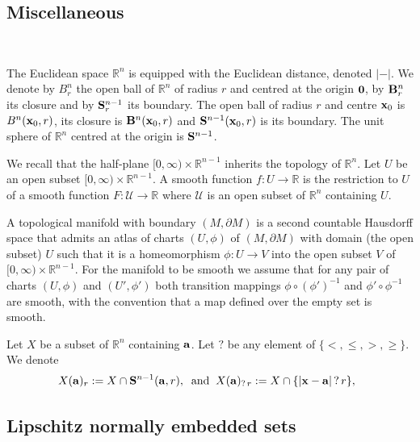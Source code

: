 \documentclass[11pt]{amsart}
\newcommand{\field}[1]{\mathbb{#1}}
\newcommand{\R}{\field{R}}
\newcommand{\ba}{{\bf a}}
\newcommand{\bbo}{{\bf 0}}
\newcommand{\bB}{{\bf B}}
\newcommand{\bS}{{\bf S}}
\newcommand{\bx}{{\bf x}}
\newcommand{\cU}{\mathcal{U}}
\newcommand{\dd}{{\partial}}
\newcommand{\Rn}{{\R^n}}
\numberwithin{equation}{section}
\numberwithin{equation}{section}
\begin{document}
\subsection{Miscellaneous}
$ $ 

The Euclidean space $\Rn$ is equipped with the Euclidean distance, denoted
$|-|$. We denote by $B_r^n$ the open ball of $\Rn$ of radius $r$ and centred 
at the origin $\bbo$, by $\bB_r^n$ its closure and by $\bS_r^{n-1}$ its 
boundary. The open ball of radius $r$ and centre $\bx_0$ is $B^n(\bx_0,r)$, 
its closure is $\bB^n(\bx_0,r)$ and $\bS^{n-1}(\bx_0,r)$ is its boundary.
The unit sphere of $\Rn$ centred at the origin is $\bS^{n-1}$.




%
%


We recall that the half-plane $[0,\infty) \times \R^{n-1}$ inherits the 
topology of $\Rn$. Let $U$ be an open subset $[0,\infty) \times \R^{n-1}$.
A smooth function $f:U\to \R$ is the restriction to $U$ of a smooth function 
$F:\cU\to\R$ where $\cU $ is an open subset of $\Rn$ containing $U$.

\smallskip
A topological manifold 
with boundary $(M,\dd M)$ is  a second countable Hausdorff space that admits an atlas of charts
$(U,\phi)$ of 
$(M,\dd M)$ with domain (the open subset) $U$ such that it is a homeomorphism $\phi:U 
\to V$ into the open subset $V$ of $[0,\infty) \times \R^{n-1}$.
For the manifold to be smooth we assume that for any pair of charts $(U,\phi)$ and $(U',\phi')$ both 
transition mappings $\phi\circ(\phi')^{-1}$ and $\phi'\circ\phi^{-1}$ are 
smooth, with the convention that a map defined over the empty set is smooth.

Let $X$ be a subset of $\Rn$ containing $\ba$. Let $?$ be any element of $\{<,\leq,>,\geq\}$. We denote
%
%
\begin{equation}\label{eq:Xar}
X(\ba)_r := X\cap \bS^{n-1}(\ba,r), \;\; {\rm and} \;\; 
X(\ba)_{? \, r} := X \cap \{|\bx-\ba| \, ? \, r\}, \;\;
\end{equation}
%
%

\subsection{Lipschitz normally embedded sets}
$ $
\end{document}

